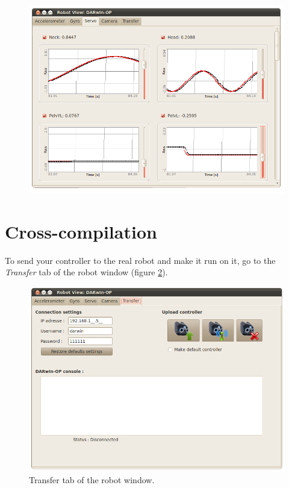 \documentclass[a4paper, 12pt]{article}  		%
\begin{document}
\begin{figure}[H]
\begin{center}
\includegraphics[width=14cm]{window_servos.png}
\label{window_servos}
\end{center}
\end{figure}



\newpage
\section{Cross-compilation}

To send your controller to the real robot and make it run on it, go to the \textit{Transfer} tab of the robot window (figure \ref{window_cross}).

\begin{figure}[H]
\begin{center}
\includegraphics[width=13cm]{window_cross.png}
\caption{Transfer tab of the robot window.}
\label{window_cross}
\end{center}
\end{figure}
\end{document}
